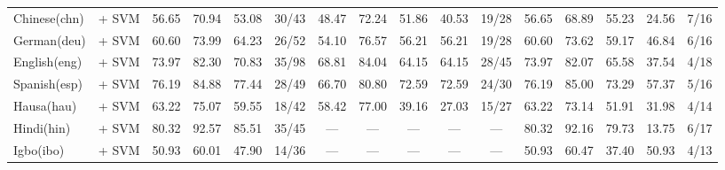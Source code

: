 \begin{table*}[h]
{\begin{tabular}{l|c|cccc|ccccc|ccccc}
            Chinese(chn)           & \citep{zpoint-large-embedding-zh} + SVM                                & 56.65                        & 70.94                        & 53.08                       & 30/43         & 48.47         & 72.24       & 51.86          & 40.53         & 19/28         & 56.65         & 68.89       & 55.23          & 24.56         & 7/16          \\
            German(deu)            & \citep{wang2024multilingual}       + SVM                               & 60.60                        & 73.99                        & 64.23                       & 26/52         & 54.10         & 76.57       & 56.21          & 56.21         & 19/28         & 60.60         & 73.62       & 59.17          & 46.84         & 6/16          \\
            English(eng)           & \citep{zhang2025jasperstelladistillationsota}  + SVM                   & 73.97                        & 82.30                        & 70.83                       & 35/98         & 68.81         & 84.04       & 64.15          & 64.15         & 28/45         & 73.97         & 82.07       & 65.58          & 37.54         & 4/18          \\
            Spanish(esp)           & \citep{wang2024multilingual}      + SVM                                & 76.19                        & 84.88                        & 77.44                       & 28/49         & 66.70         & 80.80       & 72.59          & 72.59         & 24/30         & 76.19         & 85.00       & 73.29          & 57.37         & 5/16          \\
            Hausa(hau)             & \citep{dobler-demelo-2023-focus} + SVM                                 & 63.22                        & 75.07                        & 59.55                       & 18/42         & 58.42         & 77.00       & 39.16          & 27.03         & 15/27         & 63.22         & 73.14       & 51.91          & 31.98         & 4/14          \\
            Hindi(hin)             & \citep{wang2024multilingual}  + SVM                                    & 80.32                        & 92.57                        & 85.51                       & 35/45         & —             & —           & —              & —             & —             & 80.32         & 92.16       & 79.73          & 13.75         & 6/17          \\
            Igbo(ibo)              & \citep{wang2024multilingual}   + SVM                                   & 50.93                        & 60.01                        & 47.90                       & 14/36         & —             & —           & —              & —             & —             & 50.93         & 60.47       & 37.40          & 50.93         & 4/13          \\

\end{tabular}}
\end{table*}
